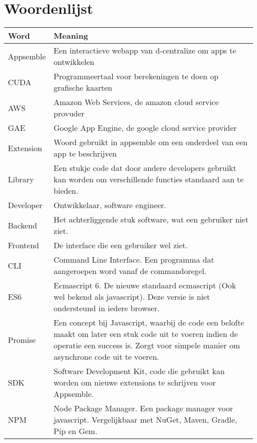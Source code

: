 \chapter{Woordenlijst}
\begin{tabular}{|p{3cm}|p{11cm}|}
	\hline
	\textbf{Word} & \textbf{Meaning} \\
	\hline
	Appsemble & Een interactieve webapp van d-centralize om apps te ontwikkelen\\ \hline
	CUDA & Programmeertaal voor berekeningen te doen op grafische kaarten \\ \hline
	AWS & Amazon Web Services, de amazon cloud service provuder \\ \hline
	GAE & Google App Engine, de google cloud service provider \\ \hline
	Extension & Woord gebruikt in appsemble om een onderdeel van een app te beschrijven \\ \hline
	Library & Een stukje code dat door andere developers gebruikt kan worden om verschillende functies standaard aan te bieden. \\ \hline
	Developer & Ontwikkelaar, software engineer. \\ \hline
	Backend & Het achterliggende stuk software, wat een gebruiker niet ziet. \\ \hline
	Frontend & De interface die een gebruiker wel ziet. \\ \hline
	CLI & Command Line Interface. Een programma dat aangeroepen word vanaf de commandoregel. \\ \hline	
	ES6 & Ecmascript 6. De nieuwe standaard ecmascript (Ook wel bekend als javascript). Deze versie is niet ondersteund in iedere browser. \\ \hline
	Promise & Een concept bij Javascript, waarbij de code een belofte maakt om later een stuk code uit te voeren indien de operatie een success is. Zorgt voor simpele manier om asynchrone code uit te voeren. \\ \hline
	SDK & Software Development Kit, code die gebruikt kan worden om nieuwe extensions te schrijven voor Appsemble. \\ \hline
	NPM & Node Package Manager. Een package manager voor javascript. Vergelijkbaar met NuGet, Maven, Gradle, Pip en Gem.
\end{tabular}